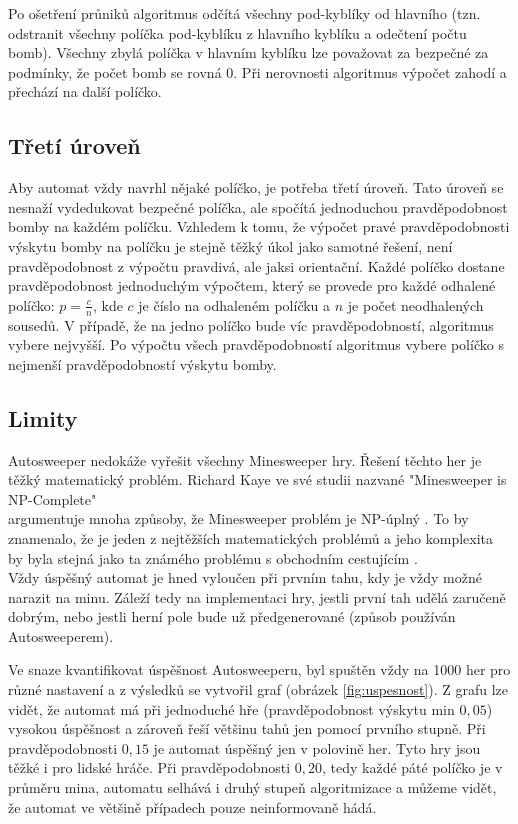 Po ošetření průniků algoritmus odčítá všechny pod-kyblíky od hlavního (tzn. odstranit všechny políčka pod-kyblíku z hlavního
kyblíku a odečtení počtu bomb). Všechny zbylá políčka v hlavním kyblíku lze považovat za bezpečné za podmínky, že počet bomb se
rovná $0$. Při nerovnosti algoritmus výpočet zahodí a přechází na další políčko.


\subsection{Třetí úroveň}
Aby automat vždy navrhl nějaké políčko, je potřeba třetí úroveň. Tato úroveň se nesnaží vydedukovat bezpečné políčka, ale spočítá
jednoduchou pravděpodobnost bomby na každém políčku. Vzhledem k tomu, že výpočet pravé pravděpodobnosti výskytu bomby na políčku
je stejně těžký úkol jako samotné řešení, není pravděpodobnost z výpočtu pravdivá, ale jaksi orientační. Každé políčko dostane
pravděpodobnost jednoduchým výpočtem, který se provede pro každé odhalené políčko: $p = \frac{c}{n}$, kde $c$ je číslo na
odhaleném políčku a $n$ je počet neodhalených sousedů. V případě, že na jedno políčko bude víc pravděpodobností, algoritmus vybere
nejvyšší. Po výpočtu všech pravděpodobností algoritmus vybere políčko s nejmenší pravděpodobností výskytu bomby.


\subsection{Limity}
Autosweeper nedokáže vyřešit všechny Minesweeper hry. Řešení těchto her je těžký matematický problém. Richard Kaye ve své studii
nazvané "Minesweeper is NP-Complete" \\argumentuje mnoha způsoby, že Minesweeper problém je NP-úplný \autocite{Kaye2000}. To by
znamenalo, že je jeden z nejtěžších matematických problémů a jeho komplexita by byla stejná jako ta známého problému s obchodním
cestujícím \autocite{wiki_tsp}. \\Vždy úspěšný automat je hned vyloučen při prvním tahu, kdy je vždy možné narazit na minu. Záleží
tedy na implementaci hry, jestli první tah udělá zaručeně dobrým, nebo jestli herní pole bude už předgenerované (způsob používán
Autosweeperem).

Ve snaze kvantifikovat úspěšnost Autosweeperu, byl spuštěn vždy na 1000 her pro různé nastavení a z výsledků se vytvořil graf
(obrázek \ref{fig:uspesnost}). Z grafu lze vidět, že automat má při jednoduché hře (pravděpodobnost výskytu min $0,05$) vysokou
úspěšnost a zároveň řeší většinu tahů jen pomocí prvního stupně. Při pravděpodobnosti $0,15$ je automat úspěšný jen v polovině
her. Tyto hry jsou těžké i pro lidské hráče. Při pravděpodobnosti $0,20$, tedy každé páté políčko je v průměru mina, automatu
selhává i druhý stupeň algoritmizace a můžeme vidět, že automat ve většině případech pouze neinformovaně hádá.

